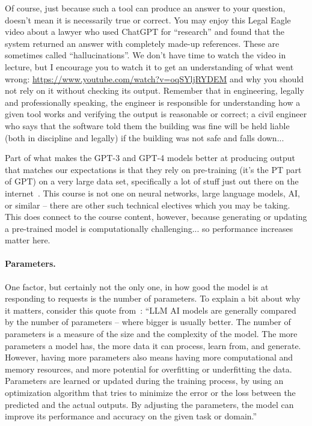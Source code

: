 Of course, just because such a tool can produce an answer to your question, doesn't mean it is necessarily true or correct. You may enjoy this Legal Eagle video about a lawyer who used ChatGPT for ``research'' and found that the system returned an answer with completely made-up references. These are sometimes called ``hallucinations''. We don't have time to watch the video in lecture, but I encourage you to watch it to get an understanding of what went wrong: \url{https://www.youtube.com/watch?v=oqSYljRYDEM} and why you should not rely on it without checking its output. Remember that in engineering, legally and professionally speaking, the engineer is responsible for understanding how a given tool works and verifying the output is reasonable or correct; a civil engineer who says that the software told them the building was fine will be held liable (both in discipline and legally) if the building was not safe and falls down...

Part of what makes the GPT-3 and GPT-4 models better at producing output that matches our expectations is that they rely on pre-training (it's the PT part of GPT) on a very large data set, specifically a lot of stuff just out there on the internet~\cite{gptforgood}. This course is not one on neural networks, large language models, AI, or similar -- there are other such technical electives which you may be taking. This does connect to the course content, however, because generating or updating a pre-trained model is computationally challenging... so performance increases matter here.

\paragraph{Parameters.} One factor, but certainly not the only one, in how good the model is at responding to requests is the number of parameters. To explain a bit about why it matters, consider this quote from~\cite{msllm}: ``LLM AI models are generally compared by the number of parameters -- where bigger is usually better. The number of parameters is a measure of the size and the complexity of the model. The more parameters a model has, the more data it can process, learn from, and generate. However, having more parameters also means having more computational and memory resources, and more potential for overfitting or underfitting the data. Parameters are learned or updated during the training process, by using an optimization algorithm that tries to minimize the error or the loss between the predicted and the actual outputs. By adjusting the parameters, the model can improve its performance and accuracy on the given task or domain.''

